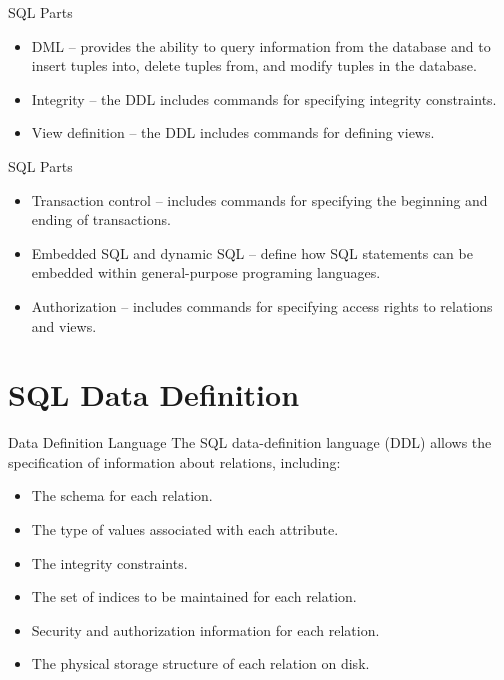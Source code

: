 \documentclass{beamer}
\begin{document}
\begin{frame}{SQL Parts}
    \begin{itemize}
        \item DML -- provides the ability to query information from the database and to insert tuples into, delete tuples from, and modify tuples in the database.
        \item Integrity -- the DDL includes commands for specifying integrity constraints.
        \item View definition -- the DDL includes commands for defining views.
    \end{itemize}
\end{frame}

\begin{frame}{SQL Parts}
    \begin{itemize}
        \item Transaction control -- includes commands for specifying the beginning and ending of transactions.
        \item Embedded SQL and dynamic SQL -- define how SQL statements can be embedded within general-purpose programing languages.
        \item Authorization -- includes commands for specifying access rights to relations and views.
    \end{itemize}
\end{frame}

\section{SQL Data Definition}

\begin{frame}{Data Definition Language}
    The SQL data-definition language (DDL) allows the specification of information about relations, including:
    \begin{itemize}
        \item The schema for each relation.
        \item The type of values associated with each attribute.
        \item The integrity constraints.
        \item The set of indices to be maintained for each relation.
        \item Security and authorization information for each relation.
        \item The physical storage structure of each relation on disk.
    \end{itemize}
\end{frame}
\end{document}
